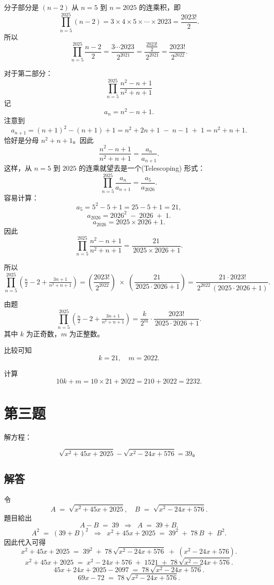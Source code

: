 \documentclass[12pt, a4paper]{article}
\theoremstyle{definition}
\theoremstyle{remark}
\begin{document}
\noindent 分子部分是 \((n-2)\) 从 \(n=5\) 到 \(n=2025\) 的连乘积，即
$$
\prod_{n=5}^{2025}(n-2) 
= 3 \times 4 \times 5 \times \cdots \times 2023 = \frac{2023!}{2}.
$$
所以
$$
\prod_{n=5}^{2025} \frac{n-2}{2}
= \frac{3\cdots 2023}{\,2^{2021}} 
= \frac{\frac{2023!}{2}}{\,2^{2021}}
= \frac{2023!}{\,2^{2022}}.
$$

\noindent 对于第二部分：
$$
\prod_{n=5}^{2025} \frac{n^2 - n +1}{n^2 + n +1}
$$
记
$$
a_n = n^2 - n + 1.
$$
注意到
$$
a_{n+1} 
= (n+1)^2 - (n+1) + 1 
= n^2 + 2n +1 \;-\; n -1 \;+\;1 
= n^2 + n +1.
$$
恰好是分母 \(n^2 + n +1\)。因此
$$
\frac{n^2 - n +1}{n^2 + n +1} 
= \frac{a_n}{a_{n+1}}.
$$
这样，从 \(n=5\) 到 \(2025\) 的连乘就望去是一个(Telescoping) 形式：
$$
\prod_{n=5}^{2025} \frac{a_n}{a_{n+1}}
= \frac{a_5}{a_{2026}}.
$$
容易计算：
$$
a_5 = 5^2 - 5 + 1 = 25 - 5 +1 = 21,
$$
$$
a_{2026} 
= 2026^2 \;-\;2026 \;+\;1.
$$
$$
a_{2026} = 2025 \times 2026 + 1.
$$
因此
$$
\prod_{n=5}^{2025}\frac{n^2 - n +1}{n^2 + n +1}
= \frac{21}{\,2025 \times 2026 +1}.
$$

\noindent 所以
$$
\prod_{n=5}^{2025}\left(\tfrac{n}{2} -2 + \tfrac{3n+1}{n^2+n+1}\right)
=\left(\frac{2023!}{\,2^{2022}}\right)
\;\times\;
\left(\frac{21}{\,2025\cdot 2026 +1}\right)
= \frac{\,21 \cdot 2023!}{\,2^{2022}\,\left(2025\cdot 2026 +1\right)}.
$$

\noindent 由题
$$
\prod_{n=5}^{2025}\left(\tfrac{n}{2} -2 + \tfrac{3n+1}{n^2+n+1}\right) = \frac{k}{2^m}\cdot \frac{2023!}{\,2025\cdot 2026+1}.
$$
其中 \(k\) 为正奇数，\(m\) 为正整数。

\noindent 比较可知
$$
k = 21,\quad m = 2022.
$$

\noindent 计算
$$
10k + m = 10 \times 21 + 2022 = 210 + 2022 = 2232.
$$

\newpage

\section{第三题}

\noindent 解方程：

$$
\sqrt{x^2+45x+2025}-\sqrt{x^2-24x+576}=39。
$$

\subsection{解答}

\noindent 令
$$
A \;=\;\sqrt{x^2 + 45x + 2025}, 
\quad
B \;=\;\sqrt{x^2 - 24x + 576}.
$$
題目給出
$$
A - B \;=\;39
\;\;\Rightarrow\;\;
A \;=\;39 + B.
$$
$$
A^2 \;=\;(39 + B)^2 
\;\;\Rightarrow\;\;
x^2 + 45x + 2025 
\;=\;
39^2 \;+\; 78\,B \;+\; B^2.
$$
因此代入可得
$$
x^2 + 45x + 2025 
\;=\;
39^2 
\;+\;
78\,\sqrt{x^2 - 24x + 576}
\;+\;
\left(x^2 - 24x + 576\right).
$$
$$
x^2 + 45x + 2025
\;=\;
x^2 - 24x + 576
\;+\;
1521
\;+\;
78\,\sqrt{x^2 - 24x + 576}.
$$
$$
45x + 24x + 2025 - 2097
\;=\;
78\,\sqrt{x^2 - 24x + 576}.
$$
$$
69x - 72 
\;=\;
78\,\sqrt{x^2 - 24x + 576}.
$$
\end{document}
